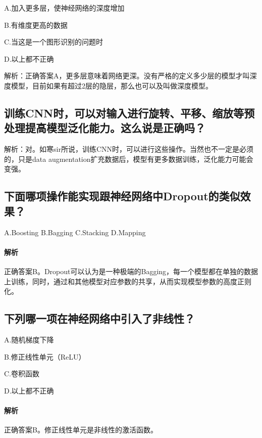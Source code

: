 \documentclass[UTF8]{ctexbook}
\begin{document}
A.加入更多层，使神经网络的深度增加

B.有维度更高的数据

C.当这是一个图形识别的问题时

D.以上都不正确



解析：正确答案A，更多层意味着网络更深。没有严格的定义多少层的模型才叫深度模型，目前如果有超过2层的隐层，那么也可以及叫做深度模型。


\subsection{训练CNN时，可以对输入进行旋转、平移、缩放等预处理提高模型泛化能力。这么说是正确吗？}


解析：对。如寒sir所说，训练CNN时，可以进行这些操作。当然也不一定是必须的，只是data augmentation扩充数据后，模型有更多数据训练，泛化能力可能会变强。

\subsection{下面哪项操作能实现跟神经网络中Dropout的类似效果？}



A.Boosting    B.Bagging    C.Stacking    D.Mapping



\paragraph{解析}正确答案B。Dropout可以认为是一种极端的Bagging，每一个模型都在单独的数据上训练，同时，通过和其他模型对应参数的共享，从而实现模型参数的高度正则化。



\subsection{下列哪一项在神经网络中引入了非线性？}

A.随机梯度下降

B.修正线性单元（ReLU）

C.卷积函数

D.以上都不正确

\paragraph{解析}正确答案B。修正线性单元是非线性的激活函数。
\end{document}
